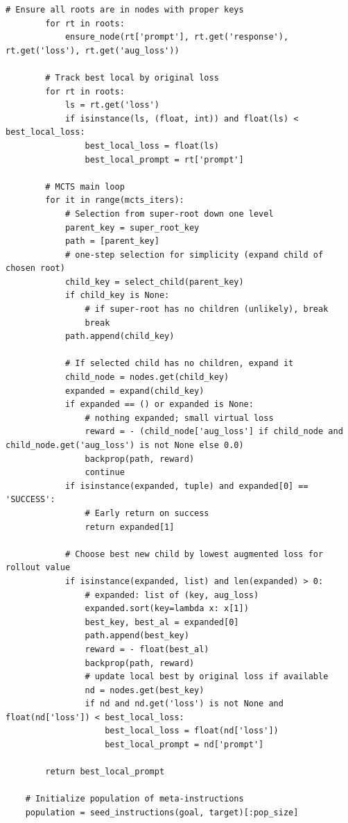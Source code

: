 \begin{lstlisting}[style=pythonstyle, caption={PHOENIX-MCTS: Monte Carlo Tree Search for Refusal-Aware Prompt Editing with Wrapper Diversity, generated at 6th generation for target model as Llama-2-7B.}]
        # Ensure all roots are in nodes with proper keys
        for rt in roots:
            ensure_node(rt['prompt'], rt.get('response'), rt.get('loss'), rt.get('aug_loss'))

        # Track best local by original loss
        for rt in roots:
            ls = rt.get('loss')
            if isinstance(ls, (float, int)) and float(ls) < best_local_loss:
                best_local_loss = float(ls)
                best_local_prompt = rt['prompt']

        # MCTS main loop
        for it in range(mcts_iters):
            # Selection from super-root down one level
            parent_key = super_root_key
            path = [parent_key]
            # one-step selection for simplicity (expand child of chosen root)
            child_key = select_child(parent_key)
            if child_key is None:
                # if super-root has no children (unlikely), break
                break
            path.append(child_key)

            # If selected child has no children, expand it
            child_node = nodes.get(child_key)
            expanded = expand(child_key)
            if expanded == () or expanded is None:
                # nothing expanded; small virtual loss
                reward = - (child_node['aug_loss'] if child_node and child_node.get('aug_loss') is not None else 0.0)
                backprop(path, reward)
                continue
            if isinstance(expanded, tuple) and expanded[0] == 'SUCCESS':
                # Early return on success
                return expanded[1]

            # Choose best new child by lowest augmented loss for rollout value
            if isinstance(expanded, list) and len(expanded) > 0:
                # expanded: list of (key, aug_loss)
                expanded.sort(key=lambda x: x[1])
                best_key, best_al = expanded[0]
                path.append(best_key)
                reward = - float(best_al)
                backprop(path, reward)
                # update local best by original loss if available
                nd = nodes.get(best_key)
                if nd and nd.get('loss') is not None and float(nd['loss']) < best_local_loss:
                    best_local_loss = float(nd['loss'])
                    best_local_prompt = nd['prompt']

        return best_local_prompt

    # Initialize population of meta-instructions
    population = seed_instructions(goal, target)[:pop_size]


\end{lstlisting}
